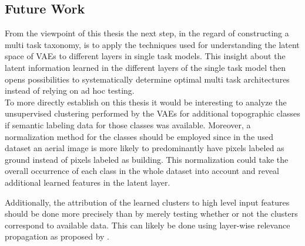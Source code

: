 \subsection{Future Work}

From the viewpoint of this thesis the next step, in the regard of constructing a multi task taxonomy, is to apply
the techniques used for understanding the latent space of VAEs to different layers in single task models. This insight
about the latent information learned in the different layers of the single task model then opens possibilities
to systematically determine optimal multi task architectures instead of relying on ad hoc testing.\\

To more directly establish on this thesis it would be interesting to analyze the unsupervised clustering performed by
the VAEs for additional topographic classes if semantic labeling data for those classes was available.
Moreover, a normalization method for the classes should be employed since in the used dataset an aerial
image is more likely to predominantly have pixels labeled as ground instead of pixels labeled as building.
This normalization could take the overall occurrence of each class in the whole dataset into account and reveal
additional learned features in the latent layer.

Additionally, the attribution of the learned clusters to high level input features should be done more precisely 
than by merely testing whether or not the clusters correspond to available data. This can likely be done using 
layer-wise relevance propagation as proposed by \textcite{2015-bach-on}.


